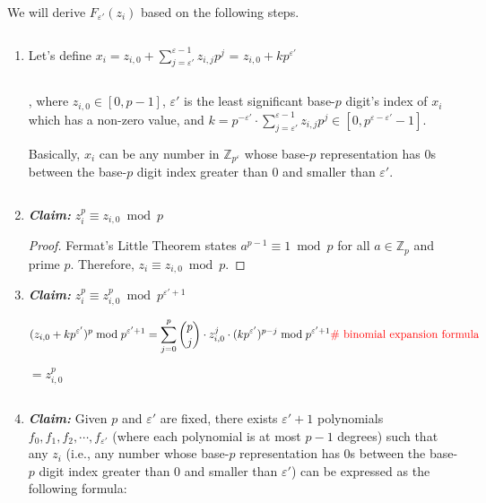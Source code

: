 $ $

 We will derive $F_{\varepsilon'}(z_i)$ based on the following steps. 

$ $

\begin{enumerate}
\item Let's define $x_i = z_{i,0} + \sum\limits_{j=\varepsilon'}^{\varepsilon-1} z_{i,j}p^j$ = $z_{i,0} + kp^{\varepsilon'}$

$ $

, where $z_{i,0} \in [0, p-1]$, \text{ } $\varepsilon'$ is the least significant base-$p$ digit's index of $x_i$ which has a non-zero value, \text{ } and \text{ } $ k = p^{-\varepsilon'}\cdot \sum\limits_{j=\varepsilon'}^{\varepsilon-1} z_{i,j}p^j \in [0, p^{\varepsilon-\varepsilon'} - 1]$. 

Basically, $x_i$ can be any number in $\mathbb{Z}_{p^\varepsilon}$ whose base-$p$ representation has 0s between the base-$p$ digit index greater than 0 and smaller than $\varepsilon'$.

$ $

\item \textbf{\textit{Claim:}} $z_i^{p} \equiv z_{i,0} \bmod p$ 

\begin{proof}
Fermat's Little Theorem states $a^{p-1} \equiv 1 \bmod p$ for all $a \in \mathbb{Z}_p$ and prime $p$. Therefore, $z_i \equiv z_{i,0} \bmod p$.
\end{proof}

\item \textbf{\textit{Claim:}} $z_i^p \equiv z_{i, 0}^p \bmod p^{\varepsilon'+1}$ 

\begin{myproof}
\[
(z_{i,0} + kp^{\varepsilon'})^p \bmod p^{\varepsilon'+1}= \sum\limits_{j=0}^{p}  \binom{p}{j}\cdot  z_{i,0}^{j} \cdot (kp^{\varepsilon'})^{p-j} \bmod p^{\varepsilon'+1} \text{\textcolor{red}{ \# binomial expansion formula}} \] 

$= z_{i,0}^{p}$
\end{myproof}

$ $

\item \textbf{\textit{Claim:}} Given $p$ and $\varepsilon'$ are fixed, there exists $\varepsilon'+1$ polynomials $f_0, f_1, f_2, \cdots, f_{\varepsilon'}$ (where each polynomial is at most $p-1$ degrees) such that any $z_i$ (i.e., any number whose base-$p$ representation has 0s between the base-$p$ digit index greater than 0 and smaller than $\varepsilon'$) can be expressed as the following formula:


\end{enumerate}
